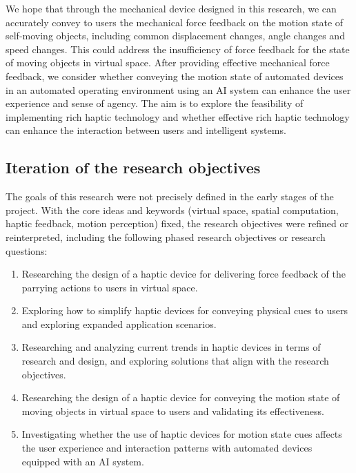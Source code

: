 We hope that through the mechanical device designed in this research, we can accurately convey to users the mechanical force feedback on the motion state of self-moving objects, including common displacement changes, angle changes and speed changes. This could address the insufficiency of force feedback for the state of moving objects in virtual space. After providing effective mechanical force feedback, we consider whether conveying the motion state of automated devices in an automated operating environment using an AI system can enhance the user experience and sense of agency. The aim is to explore the feasibility of implementing rich haptic technology and whether effective rich haptic technology can enhance the interaction between users and intelligent systems.

\subsection{Iteration of the research objectives}
The goals of this research were not precisely defined in the early stages of the project. With the core ideas and keywords (virtual space, spatial computation, haptic feedback, motion perception) fixed, the research objectives were refined or reinterpreted, including the following phased research objectives or research questions:

\begin{enumerate}
    \item Researching the design of a haptic device for delivering force feedback of the parrying actions to users in virtual space.
    \item Exploring how to simplify haptic devices for conveying physical cues to users and exploring expanded application scenarios.
    \item Researching and analyzing current trends in haptic devices in terms of research and design, and exploring solutions that align with the research objectives.
    \item Researching the design of a haptic device for conveying the motion state of moving objects in virtual space to users and validating its effectiveness.
    \item Investigating whether the use of haptic devices for motion state cues affects the user experience and interaction patterns with automated devices equipped with an AI system.
\end{enumerate}

